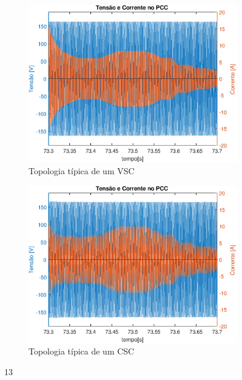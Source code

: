 \begin{figure}[!htb] %
	\centering
	\begin{subfigure}[b]{0.48\textwidth}
		\centering
		\includegraphics[width=\textwidth]{Cap4/Figuras/resultados_unfilt_13.eps}
		\caption{Topologia típica de um VSC} 
		\label{fig:resultados_unfilt_13.eps}
	\end{subfigure}%
		\hfill
	\begin{subfigure}[b]{0.48\textwidth}  
		\centering 
		\includegraphics[width=\textwidth]{Cap4/Figuras/resultados_filt_13.eps}
		\caption{Topologia típica de um CSC}    
		\label{fig:resultados_filt_13.eps}
	\end{subfigure}%
	\caption{13}
	\label{fig:13}
\end{figure}

